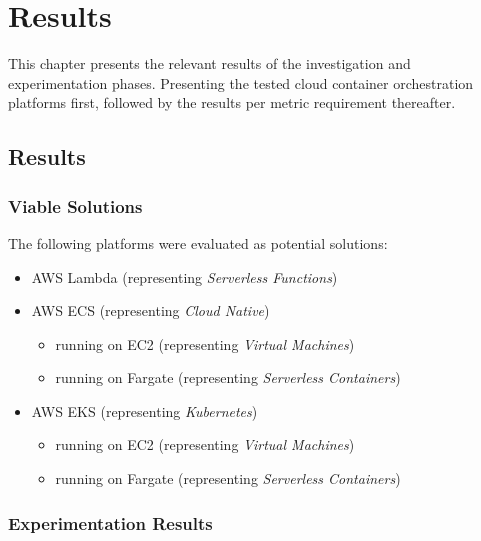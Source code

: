 \part{Results}
\label{sec:results}

This chapter presents the relevant results of the investigation and experimentation phases.
Presenting the tested cloud container orchestration platforms first,
followed by the results per metric requirement thereafter.

\chapter{Results}

\section{Viable Solutions}
The following platforms were evaluated as potential solutions:
\begin{itemize}
  \item AWS Lambda (representing \textit{Serverless Functions})
  \item AWS ECS (representing \textit{Cloud Native})
        \begin{itemize}
          \item running on EC2 (representing \textit{Virtual Machines})
          \item running on Fargate (representing \textit{Serverless Containers})
        \end{itemize}
  \item AWS EKS (representing \textit{Kubernetes})
        \begin{itemize}
          \item running on EC2 (representing \textit{Virtual Machines})
          \item running on Fargate (representing \textit{Serverless Containers})
        \end{itemize}
\end{itemize}

\section{Experimentation Results}

